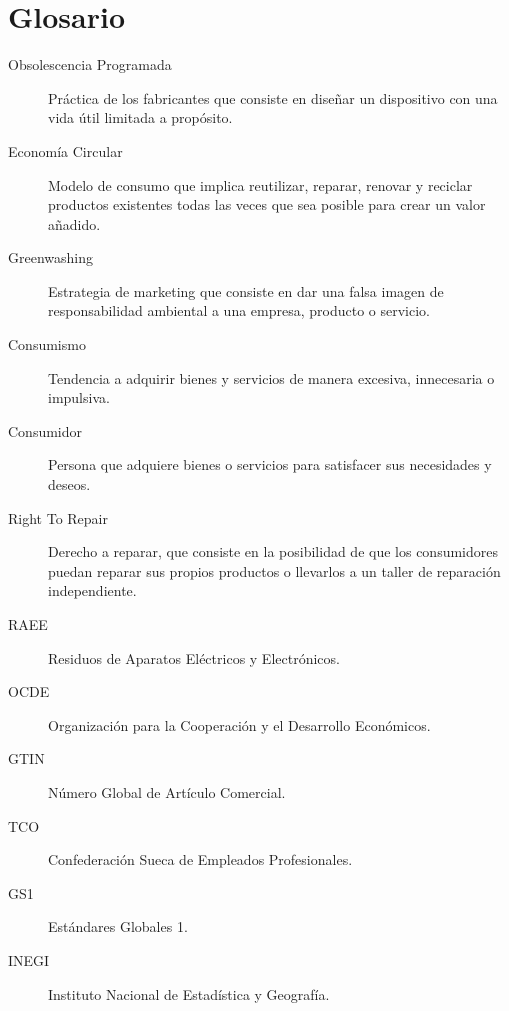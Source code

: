 \section{Glosario}

\begin{description}
    \item[Obsolescencia Programada] Práctica de los fabricantes que consiste en diseñar un dispositivo con una vida útil limitada a propósito.
    \item[Economía Circular] Modelo de consumo que implica reutilizar, reparar, renovar y reciclar productos existentes todas las veces que sea posible para crear un valor añadido.
    \item[Greenwashing] Estrategia de marketing que consiste en dar una falsa imagen de responsabilidad ambiental a una empresa, producto o servicio.
    \item[Consumismo] Tendencia a adquirir bienes y servicios de manera excesiva, innecesaria o impulsiva.
    \item[Consumidor] Persona que adquiere bienes o servicios para satisfacer sus necesidades y deseos.
    \item[Right To Repair] Derecho a reparar, que consiste en la posibilidad de que los consumidores puedan reparar sus propios productos o llevarlos a un taller de reparación independiente.  
    \item[RAEE] Residuos de Aparatos Eléctricos y Electrónicos.
    \item[OCDE] Organización para la Cooperación y el Desarrollo Económicos.
    \item[GTIN] Número Global de Artículo Comercial.
    \item[TCO] Confederación Sueca de Empleados Profesionales.
    \item[GS1] Estándares Globales 1.
    \item[INEGI] Instituto Nacional de Estadística y Geografía. 
\end{description}
